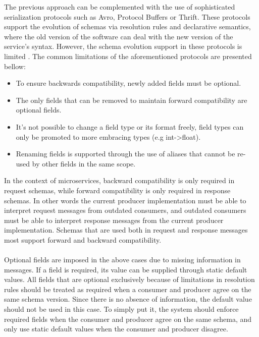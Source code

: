 The previous approach can be complemented with the use of sophisticated serialization protocols such as Avro, Protocol Buffers or Thrift.
These protocols support the evolution of schemas via resolution rules and declarative semantics,
where the old version of the software can deal with the new version of the service’s syntax.
However, the schema evolution support in these protocols is limited \cite{11}.
The common limitations of the aforementioned protocols are presented bellow:

\begin{itemize}
    \item To ensure backwards compatibility, newly added fields must be optional.
    \item The only fields that can be removed to maintain forward compatibility are optional fields.
    \item It's not possible to change a field type or its format freely, field types can only be promoted to more embracing types (e.g int->float).
    \item Renaming fields is supported through the use of aliases that cannot be re-used by other fields in the same scope.
\end{itemize}

In the context of microservices, backward compatibility is only required in request schemas, while forward compatibility is only required in response schemas.
In other words the current producer implementation must be able to interpret request messages from outdated consumers, and outdated consumers
must be able to interpret response messages from the current producer implementation.
Schemas that are used both in request and response messages most support forward and backward compatibility.

\paragraph{}

Optional fields are imposed in the above cases due to missing information in messages.
If a field is required, its value can be supplied through static default values.
All fields that are optional exclusively because of limitations in resolution rules should be treated as required when a consumer and producer agree on the same schema version.
Since there is no absence of information, the default value should not be used in this case.
To simply put it, the system should enforce required fields when the consumer and producer agree on the same schema, and only use static default values when the consumer and producer disagree.

